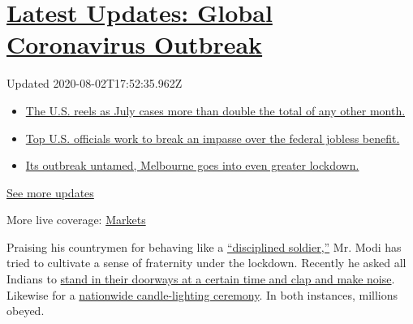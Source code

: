\hypertarget{latest-updates-global-coronavirus-outbreak}{%
\section{\texorpdfstring{\href{https://www.nytimes.com/2020/08/01/world/coronavirus-covid-19.html?action=click\&pgtype=Article\&state=default\&region=MAIN_CONTENT_1\&context=storylines_live_updates}{Latest
Updates: Global Coronavirus
Outbreak}}{Latest Updates: Global Coronavirus Outbreak}}\label{latest-updates-global-coronavirus-outbreak}}

Updated 2020-08-02T17:52:35.962Z

\begin{itemize}
\tightlist
\item
  \href{https://www.nytimes.com/2020/08/01/world/coronavirus-covid-19.html?action=click\&pgtype=Article\&state=default\&region=MAIN_CONTENT_1\&context=storylines_live_updates\#link-34047410}{The
  U.S. reels as July cases more than double the total of any other
  month.}
\item
  \href{https://www.nytimes.com/2020/08/01/world/coronavirus-covid-19.html?action=click\&pgtype=Article\&state=default\&region=MAIN_CONTENT_1\&context=storylines_live_updates\#link-780ec966}{Top
  U.S. officials work to break an impasse over the federal jobless
  benefit.}
\item
  \href{https://www.nytimes.com/2020/08/01/world/coronavirus-covid-19.html?action=click\&pgtype=Article\&state=default\&region=MAIN_CONTENT_1\&context=storylines_live_updates\#link-2bc8948}{Its
  outbreak untamed, Melbourne goes into even greater lockdown.}
\end{itemize}

\href{https://www.nytimes.com/2020/08/01/world/coronavirus-covid-19.html?action=click\&pgtype=Article\&state=default\&region=MAIN_CONTENT_1\&context=storylines_live_updates}{See
more updates}

More live coverage:
\href{https://www.nytimes.com/live/2020/07/31/business/stock-market-today-coronavirus?action=click\&pgtype=Article\&state=default\&region=MAIN_CONTENT_1\&context=storylines_live_updates}{Markets}

Praising his countrymen for behaving like a
\href{https://www.narendramodi.in/text-of-pm-s-address-to-the-nation-549264}{``disciplined
soldier,''} Mr. Modi has tried to cultivate a sense of fraternity under
the lockdown. Recently he asked all Indians to
\href{https://www.theweek.in/news/india/2020/03/23/covid-19-india-observes-janta-curfew-pm-modi-says-long-battle-ahead.html}{stand
in their doorways at a certain time and clap and make noise}. Likewise
for a
\href{https://economictimes.indiatimes.com/news/politics-and-nation/millions-of-indians-respond-to-pms-appeal-light-candles-diyas-turn-on-mobile-phone-torches/articleshow/74997232.cms}{nationwide
candle-lighting ceremony}. In both instances, millions obeyed.

